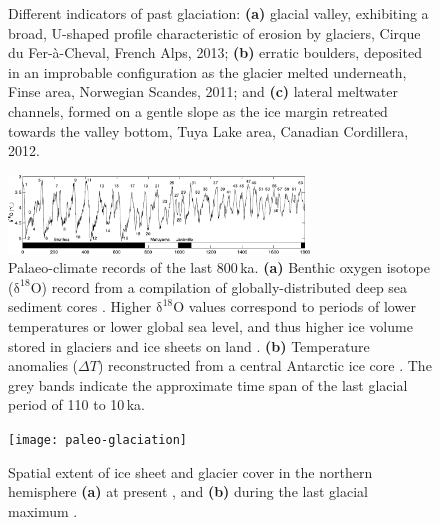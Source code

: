 \documentclass{article}
\newcommand{\chem}[1]{\ensuremath{\mathrm{#1}}}
\newcommand{\subgraphics}[3][,]{%
  \setbox1=\hbox{\texttt{[image: \#3]}}%
  \leavevmode\rlap{\usebox1}%
  \rlap{\hspace*{0.25em}
        \raisebox{\dimexpr\ht1-3ex}{\textbf{(#2)}}}%
  \phantom{\usebox1}%
}
\begin{document}
\begin{figure}
  \centering
  \makebox[0pt]{
    \subgraphics{a}{photo-glacial-valley}
    \hspace{1cm}
    \subgraphics{b}{photo-erratic-boulder}
    \hspace{1cm}
    \subgraphics{c}{photo-melt-channels}
  }
  \caption{Different indicators of past glaciation:
           \textbf{(a)} glacial valley, exhibiting a broad, U-shaped profile
           characteristic of erosion by glaciers,
           Cirque du Fer-\`{a}-Cheval, French Alps, 2013;
           \textbf{(b)} erratic boulders, deposited in an improbable
           configuration as the glacier melted underneath,
           Finse area, Norwegian Scandes, 2011; and
           \textbf{(c)} lateral meltwater channels, formed on a gentle slope
           as the ice margin retreated towards the valley bottom, Tuya Lake
           area, Canadian Cordillera, 2012.}
  \label{fig:glaciation-indicators}
\end{figure}

\begin{figure}
  \centering
  \includegraphics[width=80mm]{paleo-timeseries}
  \caption{Palaeo-climate records of the last 800\,ka.
           \textbf{(a)} Benthic oxygen isotope (\chem{\delta^{18}O}) record
           from a compilation of globally-distributed deep sea sediment cores
           \citep{Lisiecki.Raymo.2005}. Higher \chem{\delta^{18}O} values
           correspond to periods of lower temperatures \citep{Emiliani.1955}
           or lower global sea level, and thus higher ice volume stored in
           glaciers and ice sheets on land \citep{Shackleton.1967}.
           \textbf{(b)} Temperature anomalies ($\Delta T$) reconstructed from a
           central Antarctic ice core \citep[EPICA Dome~C,][]{Jouzel.etal.2007}.
           The grey bands indicate the approximate time span of the last
           glacial period of 110 to 10\,ka.}
  \label{fig:paleo-timeseries}
\end{figure}

\begin{figure}
  \centering
  \texttt{[image: paleo-glaciation]}
  \caption{Spatial extent of ice sheet and glacier cover in the northern
           hemisphere \textbf{(a)} at present \citep{Patterson.Kelso.2014}, and
           \textbf{(b)} during the last glacial maximum
           \citep{Ehlers.Gibbard.2007}.}
  \label{fig:paleo-glaciation}
\end{figure}
\end{document}
